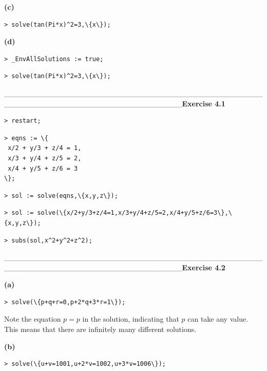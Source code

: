 \documentclass{article}
\begin{document}
\begin{Maple Normal}
\textbf{(c)}
\end{Maple Normal}
\begin{lstlisting}
> solve(tan(Pi*x)^2=3,\{x\});
\end{lstlisting}
\begin{Maple Normal}
\textbf{(d)}
\end{Maple Normal}
\begin{lstlisting}
> _EnvAllSolutions := true;
\end{lstlisting}
\begin{lstlisting}
> solve(tan(Pi*x)^2=3,\{x\});
\end{lstlisting}
\_\_\_\_\_\_\_\_\_\_\_\_\_\_\_\_\_\_\_\_\_\_\_\_\_\_\_\_\_\_\_\_\_\_\_\_\_\_\_\_\_\_\_\_\_\_\_\_\_\_\_\_\_\_\_\_\_\_\_\_\_\_\_\_\_\_\_\_\_\_\_\_\_\_\_\_\_\_\_\_\_\textbf{Exercise 4.1}\begin{lstlisting}
> restart;
\end{lstlisting}
\begin{lstlisting}
> eqns := \{
 x/2 + y/3 + z/4 = 1,
 x/3 + y/4 + z/5 = 2,
 x/4 + y/5 + z/6 = 3
\};
\end{lstlisting}
\begin{lstlisting}
> sol := solve(eqns,\{x,y,z\});
\end{lstlisting}
\begin{lstlisting}
> sol := solve(\{x/2+y/3+z/4=1,x/3+y/4+z/5=2,x/4+y/5+z/6=3\},\{x,y,z\});
\end{lstlisting}
\begin{lstlisting}
> subs(sol,x^2+y^2+z^2);
\end{lstlisting}
\_\_\_\_\_\_\_\_\_\_\_\_\_\_\_\_\_\_\_\_\_\_\_\_\_\_\_\_\_\_\_\_\_\_\_\_\_\_\_\_\_\_\_\_\_\_\_\_\_\_\_\_\_\_\_\_\_\_\_\_\_\_\_\_\_\_\_\_\_\_\_\_\_\_\_\_\_\_\_\_\_\textbf{Exercise 4.2}\begin{Maple Normal}
\textbf{(a)}
\end{Maple Normal}
\begin{lstlisting}
> solve(\{p+q+r=0,p+2*q+3*r=1\});
\end{lstlisting}
Note the equation 
$ p =p  $ in the solution, indicating that 
$ p  $ can take any value.  This means that there are infinitely many different solutions.\begin{Maple Normal}
\textbf{(b)}
\end{Maple Normal}
\begin{lstlisting}
> solve(\{u+v=1001,u+2*v=1002,u+3*v=1006\});
\end{lstlisting}
\end{document}
